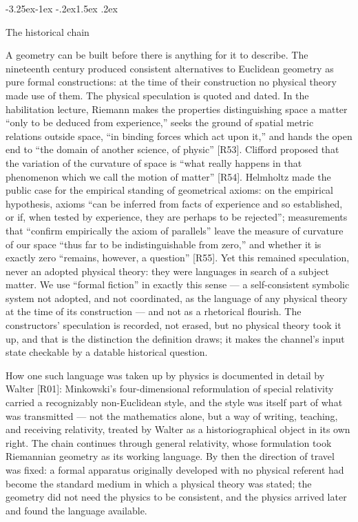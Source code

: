 \documentclass[11pt,a4paper]{article}
\makeatletter
\renewcommand\subsection{\@startsection{subsection}{2}{\z@}%
  {-3.25ex\@plus -1ex \@minus -.2ex}{1.5ex \@plus .2ex}%
  {\normalfont\large\bfseries\raggedright}}
\makeatother
\begin{document}
\subsection{The historical chain}

A geometry can be built before there is anything for it to describe. The nineteenth century produced consistent alternatives to Euclidean geometry as pure formal constructions: at the time of their construction no physical theory made use of them. The physical speculation is quoted and dated. In the habilitation lecture, Riemann makes the properties distinguishing space a matter ``only to be deduced from experience,'' seeks the ground of spatial metric relations outside space, ``in binding forces which act upon it,'' and hands the open end to ``the domain of another science, of physic'' [R53]. Clifford proposed that the variation of the curvature of space is ``what really happens in that phenomenon which we call the motion of matter'' [R54]. Helmholtz made the public case for the empirical standing of geometrical axioms: on the empirical hypothesis, axioms ``can be inferred from facts of experience and so established, or if, when tested by experience, they are perhaps to be rejected''; measurements that ``confirm empirically the axiom of parallels'' leave the measure of curvature of our space ``thus far to be indistinguishable from zero,'' and whether it is exactly zero ``remains, however, a question'' [R55]. Yet this remained speculation, never an adopted physical theory: they were languages in search of a subject matter. We use ``formal fiction'' in exactly this sense — a self-consistent symbolic system not adopted, and not coordinated, as the language of any physical theory at the time of its construction — and not as a rhetorical flourish. The constructors' speculation is recorded, not erased, but no physical theory took it up, and that is the distinction the definition draws; it makes the channel's input state checkable by a datable historical question.

How one such language was taken up by physics is documented in detail by Walter [R01]: Minkowski's four-dimensional reformulation of special relativity carried a recognizably non-Euclidean style, and the style was itself part of what was transmitted — not the mathematics alone, but a way of writing, teaching, and receiving relativity, treated by Walter as a historiographical object in its own right. The chain continues through general relativity, whose formulation took Riemannian geometry as its working language. By then the direction of travel was fixed: a formal apparatus originally developed with no physical referent had become the standard medium in which a physical theory was stated; the geometry did not need the physics to be consistent, and the physics arrived later and found the language available.
\end{document}
